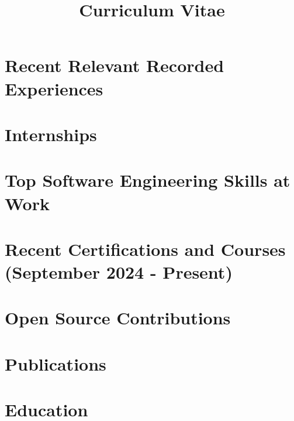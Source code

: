 \documentclass[14pt,a4paper,sans,colorlinks,urlcolor=violet, hyperindex,plainpages=false,bookmarksopen,bookmarksnumbered,pdfusetitle]{moderncv}
\title{Curriculum Vitae}
\begin{document}
\hypersetup{urlcolor=violet}

\makecvtitle
\vspace{-3em}



\vspace{-1em}

\section{Recent Relevant Recorded Experiences}


\vspace{0.5em}



\section{Internships}


\section{Top Software Engineering Skills at \textbf{Work}}


\section{Recent Certifications and Courses (September 2024 - Present)}


% 

\section{Open Source Contributions}


\section{Publications}


\section{Education}


\vspace{0.5em}


\end{document}

